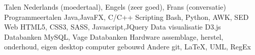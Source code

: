 \begin{cvskills}
  \cvskill
    {Talen}
    {Nederlands (moedertaal), Engels (zeer goed), Frans (conversatie) }
  \cvskill
    {Programmeertalen}
    {Java,JavaFX, C/C++}
  \cvskill
    {Scripting}
    {Bash, Python, AWK, SED}
  \cvskill
    {Web}
    {HTML5, CSS3, SASS, Javascript,JQuery}
  \cvskill
    {Data visualisatie}
    {D3.js}
  \cvskill
    {Databanken}
    {MySQL, Vage Databanken}
  \cvskill
    {Hardware}
    {assemblage, herstel, onderhoud, eigen desktop computer gebouwd}
  \cvskill
    {Andere}
    {git, \LaTeX, UML, RegEx}
\end{cvskills}
